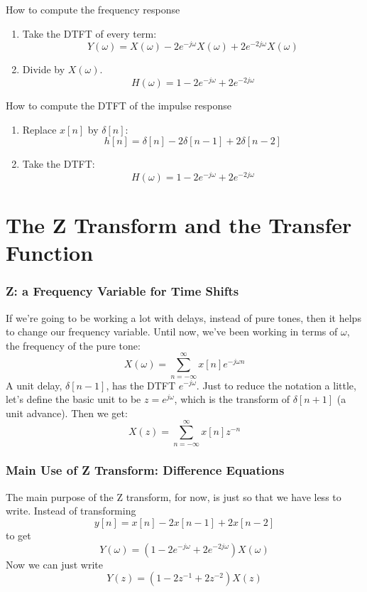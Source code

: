 \documentclass{beamer}
\begin{document}
\begin{frame}
  \begin{block}{How to compute the frequency response}
    \begin{enumerate}
    \item Take the DTFT of every term:
      \[
      Y(\omega)= X(\omega) -2e^{-j\omega}X(\omega)+2e^{-2j\omega}X(\omega)
      \]
    \item Divide by $X(\omega)$.
      \[
      H(\omega)= 1-2e^{-j\omega} +2e^{-2j\omega}
      \]
    \end{enumerate}
  \end{block}

  \begin{block}{How to compute the DTFT of the impulse response}
    \begin{enumerate}
    \item Replace $x[n]$ by $\delta[n]$:
      \[
      h[n]= \delta[n] -2\delta[n-1] +2\delta[n-2]
      \]      
    \item Take the DTFT:
      \[
      H(\omega)= 1-2e^{-j\omega} + 2e^{-2j\omega}
      \]      
    \end{enumerate}
  \end{block}
\end{frame}


\section{The Z Transform and the Transfer Function}
\setcounter{subsection}{1}

\begin{frame}
  \frametitle{Z: a Frequency Variable for Time Shifts}

  If we're going to be working a lot with delays, instead of pure
  tones, then it helps to change our frequency variable.
  Until now, we've been working in terms of $\omega$, the frequency of the pure tone:
  \[
  X(\omega) = \sum_{n=-\infty}^\infty x[n]e^{-j\omega n}
  \]
  A unit delay, $\delta[n-1]$, has the DTFT $e^{-j\omega}$.
  Just to reduce the notation a little, let's define the basic unit to be
  $z=e^{j\omega}$, which is the transform of $\delta[n+1]$ (a unit advance).  Then we  get:
  \[
  X(z)   = \sum_{n=-\infty}^\infty x[n]z^{-n}
  \]
\end{frame}

\begin{frame}
  \frametitle{Main Use of Z Transform: Difference Equations}
  
  The main purpose of the Z transform, for now, is just so that we have less to write.
  Instead of transforming
  \[
  y[n] = x[n] - 2x[n-1] + 2x[n-2]
  \]
  to get
  \[
  Y(\omega) = \left(1-2e^{-j\omega}+2e^{-2j\omega}\right)X(\omega)
  \]
  Now we can just write
  \[
  Y(z) = \left(1-2z^{-1}+2z^{-2}\right) X(z)
  \]
\end{frame}
\end{document}
